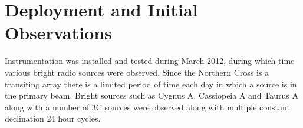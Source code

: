 \documentclass[useAMS,macros,usenatbib,onecolumn]{mn2e}
\begin{document}
%

\section{Deployment and Initial Observations}
\label{observations}

Instrumentation was installed and tested during March 2012, during which time various bright radio sources were observed.
Since the Northern Cross is a transiting array there is a limited period of time each day in which a source is in the primary beam.
Bright sources such as Cygnus A, Cassiopeia A and Taurus A along with a number of 3C sources were observed along with multiple constant declination 24 hour cycles.
\end{document}
